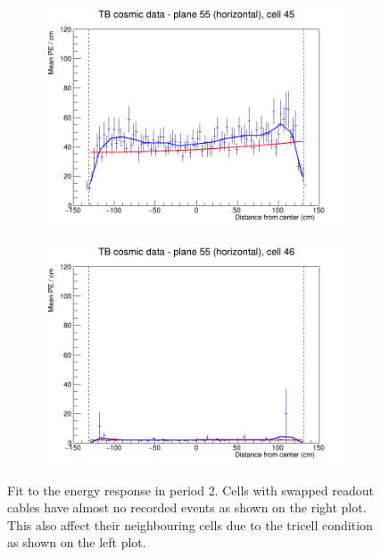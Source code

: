 \documentclass[12pt,a4paper]{article}
\begin{document}
\begin{figure}[h]
  \begin{subfigure}{0.5\textwidth}
    \includegraphics[width=\linewidth]{RelativeCalibrationResults/p2_055_045.png}
  \end{subfigure}
  \begin{subfigure}{0.5\textwidth}
    \includegraphics[width=\linewidth]{RelativeCalibrationResults/p2_055_046.png}
  \end{subfigure}
  \caption{Fit to the energy response in period 2. Cells with swapped readout cables have almost no recorded events as shown on the right plot. This also affect their neighbouring cells due to the tricell condition as shown on the left plot.}
  \label{figAttenfitResultsPerio2_SwappedCables}
\end{figure}
\end{document}
